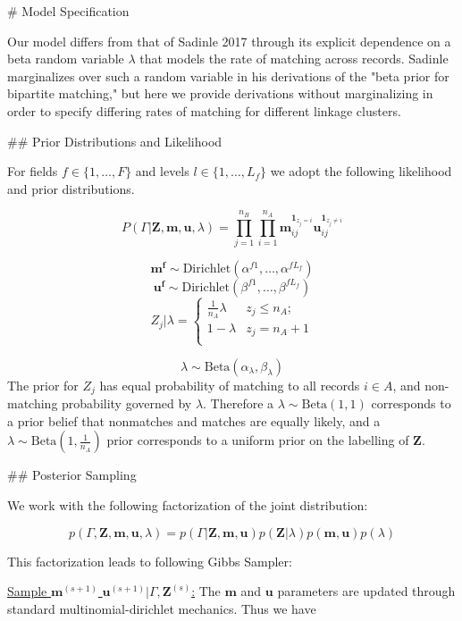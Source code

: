 \documentclass[12pt,a4paper]{article}\usepackage[]{graphicx}\usepackage[]{color}
\begin{document}
\begin{flushleft}
# Model Specification

Our model differs from that of Sadinle 2017 through its explicit dependence on a beta random variable $\lambda$ that models the rate of matching across records. Sadinle marginalizes over such a random variable in his derivations of  the "beta prior for bipartite matching," but here we provide derivations without marginalizing in order to specify differing rates of matching for different linkage clusters.

## Prior Distributions and Likelihood

For fields $f \in \{1, \ldots, F\}$ and levels $l\in \{1, \ldots, L_f\}$ we adopt the following likelihood and prior distributions.

$$P(\Gamma|\mathbf{Z}, \mathbf{m}, \mathbf{u}, \lambda) =\prod_{j=1}^{n_B}  \prod_{i=1}^{n_A}\mathbf{m}_{ij}^{\mathbf{1}_{z_j = i}}\mathbf{u}_{ij}^{\mathbf{1}_{z_j \neq i}}$$

$$\mathbf{m^{f}} \sim \text{Dirichlet}(\alpha^{f1}, \ldots, \alpha^{fL_f})$$
$$\mathbf{u^{f}} \sim \text{Dirichlet}(\beta^{f1}, \ldots, \beta^{fL_f})$$
$$Z_j | \lambda =
\begin{cases}
    \frac{1}{n_A}\lambda  & z_j \leq n_A; \\
     1-\lambda &  z_j  = n_A + 1 \\
\end{cases}$$

$$\lambda \sim \text{Beta}(\alpha_{\lambda}, \beta_{\lambda}) $$
The prior for $Z_j$ has equal probability of matching to all records $i\in A$, and non-matching probability governed by $\lambda$. Therefore a  $\lambda \sim \text{Beta}(1, 1)$ corresponds to a prior belief that nonmatches and matches are equally likely, and a $\lambda \sim \text{Beta}(1, \frac{1}{n_A})$ prior corresponds to a uniform prior on the labelling of $\mathbf{Z}$.


## Posterior Sampling

We work with the following factorization of the joint distribution:

$$p(\Gamma, \mathbf{Z}, \mathbf{m}, \mathbf{u}, \lambda) = p(\Gamma|\mathbf{Z}, \mathbf{m}, \mathbf{u}) p(\mathbf{Z} | \lambda) p(\mathbf{m}, \mathbf{u}) p(\lambda)$$

This factorization leads to following Gibbs Sampler:

\underline{Sample $\mathbf{m}^{(s+1)}$ $\mathbf{u}^{(s+1)}|\Gamma, \mathbf{Z}^{(s)}$:} The $\mathbf{m}$ and $\mathbf{u}$ parameters are updated through standard multinomial-dirichlet mechanics. Thus we have


\end{flushleft}
\end{document}
